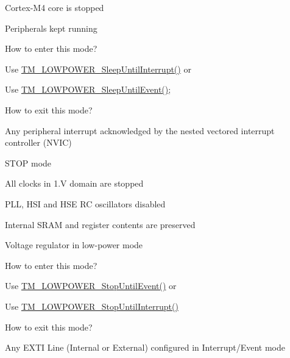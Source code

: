 \begin{DoxyItemize}
\item Cortex-\/\+M4 core is stopped
\item Peripherals kept running
\item How to enter this mode?
\begin{DoxyItemize}
\item Use \hyperlink{group___t_m___l_o_w_p_o_w_e_r___functions_gaabe385d1398fe280b93db08bd615c966}{T\+M\+\_\+\+L\+O\+W\+P\+O\+W\+E\+R\+\_\+\+Sleep\+Until\+Interrupt()} or
\item Use \hyperlink{group___t_m___l_o_w_p_o_w_e_r___functions_gaf92d2da64f91b05c1f3638903d597e74}{T\+M\+\_\+\+L\+O\+W\+P\+O\+W\+E\+R\+\_\+\+Sleep\+Until\+Event()};
\end{DoxyItemize}
\item How to exit this mode?
\begin{DoxyItemize}
\item Any peripheral interrupt acknowledged by the nested vectored interrupt controller (N\+V\+I\+C)
\end{DoxyItemize}
\end{DoxyItemize}

\begin{DoxyParagraph}{S\+T\+O\+P mode}

\end{DoxyParagraph}

\begin{DoxyItemize}
\item All clocks in 1.\+V domain are stopped
\item P\+L\+L, H\+S\+I and H\+S\+E R\+C oscillators disabled
\item Internal S\+R\+A\+M and register contents are preserved
\item Voltage regulator in low-\/power mode
\item How to enter this mode?
\begin{DoxyItemize}
\item Use \hyperlink{group___t_m___l_o_w_p_o_w_e_r___functions_gac5f4965b4e018c7a0fba6279a639017a}{T\+M\+\_\+\+L\+O\+W\+P\+O\+W\+E\+R\+\_\+\+Stop\+Until\+Event()} or
\item Use \hyperlink{group___t_m___l_o_w_p_o_w_e_r___functions_gaacd221196935edc76adb733354d7b095}{T\+M\+\_\+\+L\+O\+W\+P\+O\+W\+E\+R\+\_\+\+Stop\+Until\+Interrupt()}
\end{DoxyItemize}
\item How to exit this mode?
\begin{DoxyItemize}
\item Any E\+X\+T\+I Line (Internal or External) configured in Interrupt/\+Event mode
\end{DoxyItemize}
\end{DoxyItemize}

